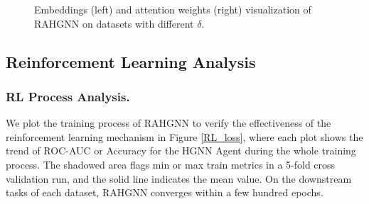 \begin{figure}[ht]
\centering
{}
\centering
\caption{Embeddings (left) and attention weights (right) visualization of RAHGNN on datasets with different $\delta$.}
\label{visualization2}
\end{figure}

\subsection{Reinforcement Learning Analysis}
\subsubsection{RL Process Analysis.}
We plot the training process of RAHGNN to verify the effectiveness of the reinforcement learning mechanism in Figure \ref{RL_loss}, where each plot shows the trend of ROC-AUC or Accuracy for the HGNN Agent during the whole training process. The shadowed area flags min or max train metrics in a 5-fold cross validation run, and the solid line indicates the mean value. On the downstream tasks of each dataset, RAHGNN converges within a few hundred epochs.


